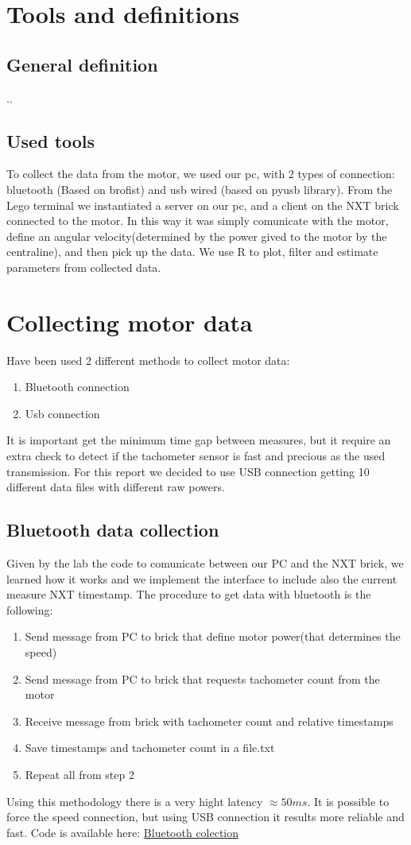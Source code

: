 \documentclass[a4paper,12pt,oneside]{article}
\begin{document}
\section{Tools and definitions}


\subsection{General definition}
..
\subsection{Used tools}
To collect the data from the motor, we used our pc, with 2 types of connection: bluetooth (Based on brofist) and usb wired (based on pyusb library). From the Lego terminal we instantiated a server on our pc, and a client on the NXT brick  connected to the motor. In this way it was simply comunicate with the motor, define an angular velocity(determined by the power gived to the motor by the centraline), and then pick up the data. We use R to plot, filter and estimate parameters from collected data. 

\section{Collecting motor data}
Have been used 2 different methods to collect motor data:
\begin{enumerate}
\item Bluetooth connection
\item Usb connection
\end{enumerate}
It is important get the minimum time gap between measures, but it require an extra check to detect if the tachometer sensor is fast and precious as the used transmission.
For this report we decided to use USB connection getting 10 different data files with different raw powers.
\subsection{Bluetooth data collection}
Given by the lab the code to comunicate between our PC and the NXT brick, we learned how it works and we implement the interface to include also the current measure NXT timestamp. The procedure to get data with bluetooth is the following:
\begin{enumerate}
\item Send message from PC to brick that define motor power(that determines the speed)
\item Send message from PC to brick that requests tachometer count from the motor
\item Receive message from brick with tachometer count and relative timestamps
\item Save timestamps and tachometer count in a file.txt
\item Repeat all from step 2
\end{enumerate}
Using this methodology there is a very hight latency $\approx 50ms$. It is possible to force the speed connection, but using USB connection it results more reliable and fast.
Code is available here: \href{https://github.com/AliaksandrSiarohin/AppliedRobotics/brofist}{Bluetooth colection}
\end{document}
